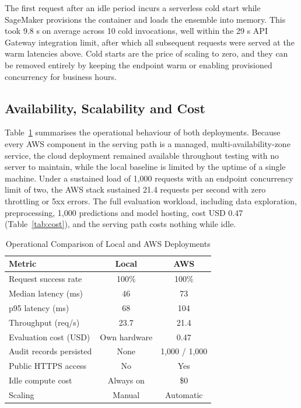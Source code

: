 \documentclass[conference]{IEEEtran}
\begin{document}
The first request after an idle period incurs a serverless cold start while SageMaker provisions the container and loads the ensemble into memory. This took 9.8 s on average across 10 cold invocations, well within the 29 s API Gateway integration limit, after which all subsequent requests were served at the warm latencies above. Cold starts are the price of scaling to zero, and they can be removed entirely by keeping the endpoint warm or enabling provisioned concurrency for business hours.

\subsection{Availability, Scalability and Cost}
Table~\ref{tab:ops} summarises the operational behaviour of both deployments. Because every AWS component in the serving path is a managed, multi-availability-zone service, the cloud deployment remained available throughout testing with no server to maintain, while the local baseline is limited by the uptime of a single machine. Under a sustained load of 1,000 requests with an endpoint concurrency limit of two, the AWS stack sustained 21.4 requests per second with zero throttling or 5xx errors. The full evaluation workload, including data exploration, preprocessing, 1,000 predictions and model hosting, cost USD 0.47 (Table~\ref{tab:cost}), and the serving path costs nothing while idle.

\begin{table}[htbp]
\caption{Operational Comparison of Local and AWS Deployments}
\begin{center}
\begin{tabular}{|l|c|c|}
\hline
\textbf{Metric} & \textbf{Local} & \textbf{AWS} \\
\hline
Request success rate & 100\% & 100\% \\
Median latency (ms) & 46 & 73 \\
p95 latency (ms) & 68 & 104 \\
Throughput (req/s) & 23.7 & 21.4 \\
Evaluation cost (USD) & Own hardware & 0.47 \\
Audit records persisted & None & 1,000 / 1,000 \\
Public HTTPS access & No & Yes \\
Idle compute cost & Always on & \$0 \\
Scaling & Manual & Automatic \\
\hline
\end{tabular}
\label{tab:ops}
\end{center}
\end{table}
\end{document}
